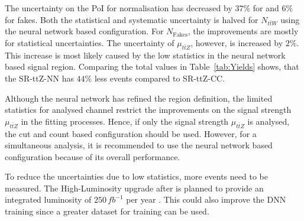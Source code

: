 \documentclass[bachelor,oneside, BCOR10mm,
			ngerman,english  %
]{GAUBM}
\begin{document}
The uncertainty on the PoI for normalisation has decreased by $37\%$ for \ttbarW and $6\%$ for fakes. Both the statistical and systematic uncertainty is halved for $N_{t\bar{t}W}$ using the neural network based configuration. For $N_\text{Fakes}$, the improvements are mostly for statistical uncertainties. The uncertainty of $\mu_{t\bar{t}Z}$, however, is increased by $2\%$. This increase is most likely caused by the low statistics in the neural network based signal region. Comparing the total values in Table~\ref{tab:Yields} shows, that the SR-ttZ-NN has $44\%$ less events compared to SR-ttZ-CC. 

Although the neural network has refined the region definition, the limited statistics for analysed channel restrict the improvements on the signal strength $\mu_{t\bar{t}Z}$ in the fitting processes. Hence, if only the signal strength $\mu_{t\bar{t}Z}$ is analysed, the cut and count based configuration should be used. However, for a simultaneous analysis, it is recommended to use the neural network based configuration because of its overall performance.

To reduce the uncertainties due to low statistics, more events need to be measured. The High-Luminosity \lhc upgrade after \runiii is planned to provide an integrated luminosity of $250\,\unit{fb}^{-1}$ per year \cite{highlumiupgrade}. This could also improve the DNN training since a greater dataset for training can be used.
\end{document}
